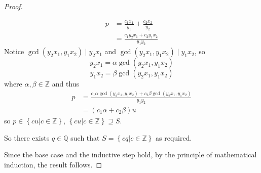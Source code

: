 \documentclass[letterpaper,12pt]{article}
\newcommand{\set}[1]{\left\{ #1 \right\}}
\theoremstyle{definition}
\begin{document}
\begin{enumerate}
\begin{mdframed}
\begin{proof}
\begin{itemize}
\begin{itemize}
\begin{align*}
                p &= \frac{c_1x_1}{y_1} + \frac{c_2 x_2}{y_2} \\
                &= \frac{c_1y_2x_1 + c_2 y_1x_2}{y_1y_2}
            \end{align*}
            Notice $\gcd (y_2x_1,y_1x_2) \mid y_2x_1$ and $\gcd (y_2x_1,y_1x_2) \mid y_1x_2$, so $$y_2x_1 = \alpha \gcd (y_2x_1,y_1x_2)$$ $$y_1x_2 = \beta \gcd (y_2x_1,y_1x_2)$$ where $\alpha,\beta \in \mathbb{Z}$ and thus
            \begin{align*}
                p &= \frac{c_1\alpha \gcd (y_2x_1,y_1x_2)  + c_2 \beta \gcd (y_2x_1,y_1x_2)}{y_1y_2} \\
                &= (c_1\alpha + c_2 \beta) u
            \end{align*}
            so $p \in \set{ cu| c \in \mathbb{Z} }$, $\set{ cu| c \in \mathbb{Z} } \supseteq S$.
        \end{itemize}
        So there exists $q \in \mathbb{Q}$ such that $S = \set{cq| c \in \mathbb{Z}}$ as required.
    \end{itemize}
    Since the base case and the inductive step hold, by the principle of mathematical induction, the result follows.
      \end{proof}
  \end{mdframed}
\end{enumerate}
\pagebreak
\end{document}
